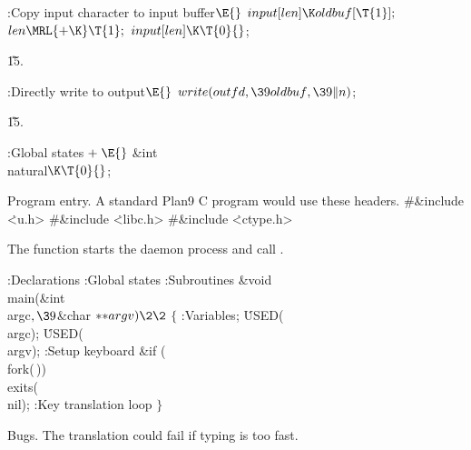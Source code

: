 \B{}:Copy input character to input buffer\X${}\E{}$\6
$\\{input}[\\{len}]\K\\{oldbuf}[\T{1}];{}$\6
${}\\{len}\MRL{+{\K}}\T{1};{}$\6
${}\\{input}[\\{len}]\K\T{0}{}$;\par
\U15.\fi

\B{}:Directly write to output\X${}\E{}$\6
$\\{write}(\\{outfd},\39\\{oldbuf},\39\|n){}$;\par
\U15.\fi

\B{}:Global states\X${}\mathrel+\E{}$\6
\&{int} \\{natural}${}\K\T{0}{}$;\par
\fi

Program entry. A standard Plan9 C program would use these headers.
\Y\B\8\#\&{include} \.{<u.h>}\6
\8\#\&{include} \.{<libc.h>}\6
\8\#\&{include} \.{<ctype.h>}\par
\fi

The  function starts the daemon process and call .

\Y\B{}:Declarations\X\6
:Global states\X\6
:Subroutines\X\7
\1\1\&{void} \\{main}(\&{int} \\{argc}${},\39{}$\&{char} ${}{*}{*}\\{argv})\2%
\2{}$\6
${}\{{}$\1\6
:Variables\X;\6
\.{USED}(\\{argc});\6
\.{USED}(\\{argv});\6
:Setup keyboard\X\6
\&{if} (\\{fork}(\,))\1\5
\\{exits}(\\{nil});\2\6
:Key translation loop\X\6
\4${}\}{}$\2\par
\fi

Bugs. The translation could fail if typing is too fast.
\fi

\inx
\fin
\con
